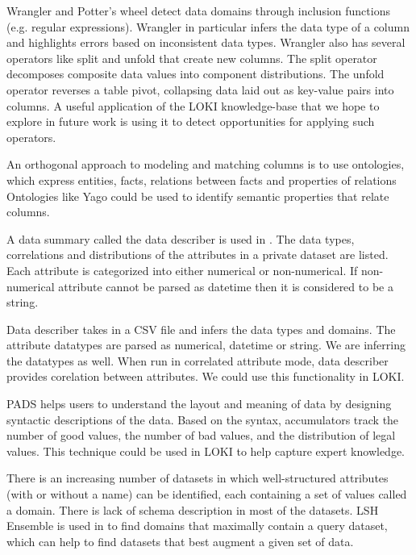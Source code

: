 \documentclass{vldb}
\begin{document}
Wrangler \cite{kandel2011wrangler} and Potter's wheel \cite{raman2001potter} detect data domains through inclusion functions (e.g. regular expressions).
Wrangler in particular infers the data type of a column and highlights errors based on inconsistent data types. 
Wrangler also has several operators like split and unfold that create new columns.
The split operator decomposes composite data values into component distributions.  
The unfold operator reverses a table pivot, collapsing data laid out as key-value pairs into columns.  
A useful application of the LOKI knowledge-base that we hope to explore in future work is using it to detect opportunities for applying such operators.

An orthogonal approach to modeling and matching columns is to use ontologies, which express entities, facts, relations between facts and properties of relations
Ontologies like Yago \cite{fabian2007yago} could be used to identify semantic properties that relate columns.

A data summary called the data describer is used in \cite{ping2017datasynthesizer}. The data types, correlations and distributions of the attributes in a private dataset are listed. Each attribute is categorized into either numerical or non-numerical. If non-numerical attribute cannot be parsed as datetime then it is considered to be a string.

Data describer takes in a CSV file and infers the data types and domains. The attribute datatypes are parsed as numerical, datetime or string. We are inferring the datatypes as well. When run in correlated attribute mode, data describer provides corelation between attributes. We could use this functionality in LOKI.

PADS \cite{fisher2005pads} helps users to understand the layout and meaning of data by designing syntactic descriptions of the data.
Based on the syntax, accumulators track the number of good values, the number of bad values, and the distribution of legal values.
This technique could be used in LOKI to help capture expert knowledge.

There is an increasing number of datasets in which well-structured attributes
(with or without a name) can be identified, each containing a set of values called a domain. There is lack of schema description in most of the datasets.
LSH Ensemble is used in \cite{zhu2016lsh} to find domains that maximally contain a query dataset, which can help to find datasets that best augment a given set of data.
\end{document}
